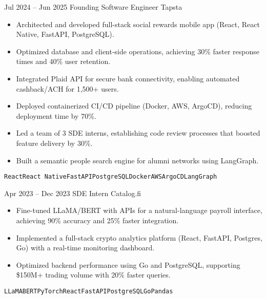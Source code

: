 \documentclass[9pt]{developercv} %
\begin{document}
\vspace{0.5cm}



\begin{entrylist}
	\entry
		{Jul 2024 -- Jun 2025}
		{Founding Software Engineer}
		{Tapsta}
		{
            \begin{itemize}
                \item Architected and developed full-stack social rewards mobile app (React, React Native, FastAPI, PostgreSQL).
                \item Optimized database and client-side operations, achieving 30\% faster response times and 40\% user retention.
                \item Integrated Plaid API for secure bank connectivity, enabling automated cashback/ACH for 1,500+ users.
                \item Deployed containerized CI/CD pipeline (Docker, AWS, ArgoCD), reducing deployment time by 70\%.
                \item Led a team of 3 SDE interns, establishing code review processes that boosted feature delivery by 30\%.
                \item Built a semantic people search engine for alumni networks using LangGraph.
            \end{itemize}
            \texttt{React}\slashsep\texttt{React Native}\slashsep\texttt{FastAPI}\slashsep\texttt{PostgreSQL}\slashsep\texttt{Docker}\slashsep\texttt{AWS}\slashsep\texttt{ArgoCD}\slashsep\texttt{LangGraph}
        }
	\entry
		{Apr 2023 -- Dec 2023}
		{SDE Intern}
		{Catalog.fi}
		{
            \begin{itemize}
                \item Fine-tuned LLaMA/BERT with APIs for a natural-language payroll interface, achieving 90\% accuracy and 25\% faster integration.
                \item Implemented a full-stack crypto analytics platform (React, FastAPI, Postgres, Go) with a real-time monitoring dashboard.
                \item Optimized backend performance using Go and PostgreSQL, supporting \$150M+ trading volume with 20\% faster queries.
            \end{itemize}
            \texttt{LLaMA}\slashsep\texttt{BERT}\slashsep\texttt{PyTorch}\slashsep\texttt{React}\slashsep\texttt{FastAPI}\slashsep\texttt{PostgreSQL}\slashsep\texttt{Go}\slashsep\texttt{Pandas}
}
\end{entrylist}
\end{document}
